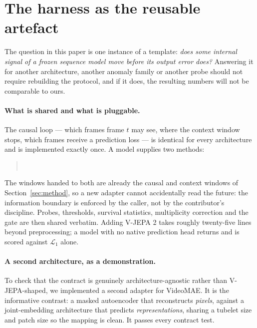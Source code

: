 \section{The harness as the reusable artefact}
\label{sec:reuse}

The question in this paper is one instance of a template: \emph{does some
internal signal of a frozen sequence model move before its output error does?}
Answering it for another architecture, another anomaly family or another probe
should not require rebuilding the protocol, and if it does, the resulting
numbers will not be comparable to ours.

\paragraph{What is shared and what is pluggable.}
The causal loop --- which frames frame $t$ may see, where the context window
stops, which frames receive a prediction loss --- is identical for every
architecture and is implemented exactly once. A model supplies two methods:

\begin{quote}
 \\
\end{quote}

\noindent
The windows handed to both are already the causal and context windows of
Section~\ref{sec:method}, so a new adapter cannot accidentally read the future:
the information boundary is enforced by the caller, not by the contributor's
discipline. Probes, thresholds, survival statistics, multiplicity correction and
the gate are then shared verbatim. Adding V-JEPA 2 takes roughly twenty-five
lines beyond preprocessing; a model with no native prediction head returns
 and is scored against $\mathcal{L}_1$ alone.

\paragraph{A second architecture, as a demonstration.}
To check that the contract is genuinely architecture-agnostic rather than
V-JEPA-shaped, we implemented a second adapter for VideoMAE. It is the
informative contrast: a masked autoencoder that reconstructs \emph{pixels},
against a joint-embedding architecture that predicts \emph{representations},
sharing a tubelet size and patch size so the mapping is clean. It passes every
contract test.

